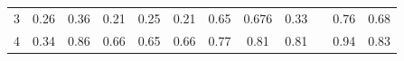 \documentclass[twoside,11pt]{article}
\begin{document}
\begin{table}[H]
{\begin{tabular}{ccccccccclcc}
\multicolumn{1}{|c|}{3}                                                                           & \multicolumn{1}{c|}{0.26}                                                           & \multicolumn{1}{c|}{0.36}                                                                      & \multicolumn{1}{c|}{0.21}                                                                & \multicolumn{1}{c|}{0.25}                                                                & \multicolumn{1}{c|}{0.21}                                                                & \multicolumn{1}{c|}{\cellcolor[HTML]{ECF4FF}0.65}                                           & \multicolumn{1}{c|}{\cellcolor[HTML]{FFCCC9}0.676}                                          & \multicolumn{1}{c|}{0.33}                                                                   & \multicolumn{1}{l|}{}                    & \multicolumn{1}{c|}{0.76}                                                                      & \multicolumn{1}{c|}{0.68}                                                                      \\ \cline{1-1}
\multicolumn{1}{|c|}{4}                                                                           & \multicolumn{1}{c|}{0.34}                                                           & \multicolumn{1}{c|}{\cellcolor[HTML]{FFCCC9}0.86}                                              & \multicolumn{1}{c|}{0.66}                                                                & \multicolumn{1}{c|}{0.65}                                                                & \multicolumn{1}{c|}{0.66}                                                                & \multicolumn{1}{c|}{0.77}                                                                   & \multicolumn{1}{c|}{\cellcolor[HTML]{ECF4FF}0.81}                                           & \multicolumn{1}{c|}{0.81}                                                                   & \multicolumn{1}{l|}{}                    & \multicolumn{1}{c|}{0.94}                                                                      & \multicolumn{1}{c|}{0.83}                                                                      \\ \cline{1-1}

\end{tabular}}
\end{table}
\end{document}

